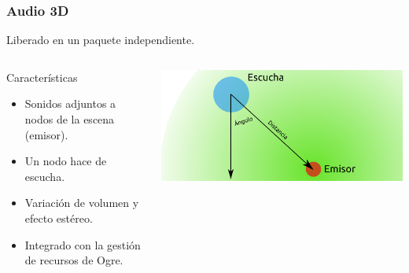 \documentclass[green]{beamer}
\begin{document}
\begin{frame}
\transdissolve
    \frametitle{Audio 3D}
    
    \tiny{
    \begin{center}
	Liberado en un paquete independiente.
    \end{center}
    }
    
    \begin{columns}[c]
    \column{150pt}
        
	\scriptsize{
	\begin{block}{Características}
            \begin{itemize}
                \item Sonidos adjuntos a nodos de la escena (emisor).
		\item Un nodo hace de escucha.
		\item Variación de volumen y efecto estéreo.
		\item Integrado con la gestión de recursos de Ogre.
            \end{itemize}            
        \end{block}
	}
	
	

    \column{150pt}
        
	\begin{center}
	    \includegraphics[scale=0.9]{img/audio3d-esquema.png}
	\end{center}
	
    \end{columns} 
\end{frame}
\end{document}
